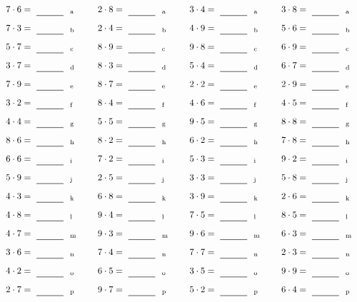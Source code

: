 \documentclass
[
  draft    = true,
  fontsize = 11pt,
  parskip  = half-
]
{scrartcl}
\begin{document}
\par\vfill\par
\begin{align*}
    \pline{7\cdot6}&=\rline{a}
  & \pline{2\cdot8}&=\rline{a}
  & \pline{3\cdot4}&=\rline{a}
  & \pline{3\cdot8}&=\rline{a} \\[1ex]
    \pline{7\cdot3}&=\rline{b}
  & \pline{2\cdot4}&=\rline{b}
  & \pline{4\cdot9}&=\rline{b}
  & \pline{5\cdot6}&=\rline{b} \\[1ex]
    \pline{5\cdot7}&=\rline{c}
  & \pline{8\cdot9}&=\rline{c}
  & \pline{9\cdot8}&=\rline{c}
  & \pline{6\cdot9}&=\rline{c} \\[1ex]
    \pline{3\cdot7}&=\rline{d}
  & \pline{8\cdot3}&=\rline{d}
  & \pline{5\cdot4}&=\rline{d}
  & \pline{6\cdot7}&=\rline{d} \\[1ex]
    \pline{7\cdot9}&=\rline{e}
  & \pline{8\cdot7}&=\rline{e}
  & \pline{2\cdot2}&=\rline{e}
  & \pline{2\cdot9}&=\rline{e} \\[1ex]
    \pline{3\cdot2}&=\rline{f}
  & \pline{8\cdot4}&=\rline{f}
  & \pline{4\cdot6}&=\rline{f}
  & \pline{4\cdot5}&=\rline{f} \\[1ex]
    \pline{4\cdot4}&=\rline{g}
  & \pline{5\cdot5}&=\rline{g}
  & \pline{9\cdot5}&=\rline{g}
  & \pline{8\cdot8}&=\rline{g} \\[1ex]
    \pline{8\cdot6}&=\rline{h}
  & \pline{8\cdot2}&=\rline{h}
  & \pline{6\cdot2}&=\rline{h}
  & \pline{7\cdot8}&=\rline{h} \\[1ex]
    \pline{6\cdot6}&=\rline{i}
  & \pline{7\cdot2}&=\rline{i}
  & \pline{5\cdot3}&=\rline{i}
  & \pline{9\cdot2}&=\rline{i} \\[1ex]
    \pline{5\cdot9}&=\rline{j}
  & \pline{2\cdot5}&=\rline{j}
  & \pline{3\cdot3}&=\rline{j}
  & \pline{5\cdot8}&=\rline{j} \\[1ex]
    \pline{4\cdot3}&=\rline{k}
  & \pline{6\cdot8}&=\rline{k}
  & \pline{3\cdot9}&=\rline{k}
  & \pline{2\cdot6}&=\rline{k} \\[1ex]
    \pline{4\cdot8}&=\rline{l}
  & \pline{9\cdot4}&=\rline{l}
  & \pline{7\cdot5}&=\rline{l}
  & \pline{8\cdot5}&=\rline{l} \\[1ex]
    \pline{4\cdot7}&=\rline{m}
  & \pline{9\cdot3}&=\rline{m}
  & \pline{9\cdot6}&=\rline{m}
  & \pline{6\cdot3}&=\rline{m} \\[1ex]
    \pline{3\cdot6}&=\rline{n}
  & \pline{7\cdot4}&=\rline{n}
  & \pline{7\cdot7}&=\rline{n}
  & \pline{2\cdot3}&=\rline{n} \\[1ex]
    \pline{4\cdot2}&=\rline{o}
  & \pline{6\cdot5}&=\rline{o}
  & \pline{3\cdot5}&=\rline{o}
  & \pline{9\cdot9}&=\rline{o} \\[1ex]
    \pline{2\cdot7}&=\rline{p}
  & \pline{9\cdot7}&=\rline{p}
  & \pline{5\cdot2}&=\rline{p}
  & \pline{6\cdot4}&=\rline{p}
\end{align*}
\end{document}
